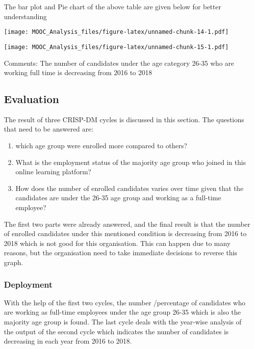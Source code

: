 \documentclass[
]{article}
\begin{document}
The bar plot and Pie chart of the above table are given below for better
understanding

\texttt{[image: MOOC\_Analysis\_files/figure-latex/unnamed-chunk-14-1.pdf]}

\texttt{[image: MOOC\_Analysis\_files/figure-latex/unnamed-chunk-15-1.pdf]}

Comments: The number of candidates under the age category 26-35 who are
working full time is decreasing from 2016 to 2018

\hypertarget{evaluation-3}{%
\subsection{Evaluation}\label{evaluation-3}}

The result of three CRISP-DM cycles is discussed in this section. The
questions that need to be answered are:

\begin{enumerate}
\def\labelenumi{\arabic{enumi}.}
\item
  which age group were enrolled more compared to others?
\item
  What is the employment status of the majority age group who joined in
  this online learning platform?
\item
  How does the number of enrolled candidates varies over time given that
  the candidates are under the 26-35 age group and working as a
  full-time employee?
\end{enumerate}

The first two parts were already answered, and the final result is that
the number of enrolled candidates under this mentioned condition is
decreasing from 2016 to 2018 which is not good for this organisation.
This can happen due to many reasons, but the organisation need to take
immediate decisions to reverse this graph.

\hypertarget{deployment-1}{%
\subsubsection{Deployment}\label{deployment-1}}

With the help of the first two cycles, the number /percentage of
candidates who are working as full-time employees under the age group
26-35 which is also the majority age group is found. The last cycle
deals with the year-wise analysis of the output of the second cycle
which indicates the number of candidates is decreasing in each year from
2016 to 2018.
\end{document}

